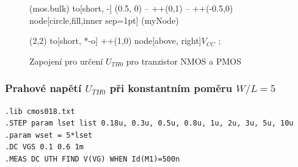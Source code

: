 \begin{figure}[H]
\begin{minipage}{0.5\textwidth}
\begin{circuitikz}[scale=1, transform shape]
              
              (mos.bulk) to[short, -] (0.5, 0) -- ++(0,1) -- ++(-0.5,0)  node[circle,fill,inner sep=1pt] (myNode) {}

              (2,2)  to[short, *-o] ++(1,0) node[above, right]{$V_{CC}$}
            ;
        \end{circuitikz}

        \vspace{5mm} 
    \end{minipage}
    \caption{\label{cod:cod_NP_WL_const} Zapojení pro určení \(U_{TH0}\) pro tranzistor NMOS a PMOS}
\end{figure}

\newpage
\subsubsection{Prahové napětí \(U_{TH0}\) při konstantním poměru \(W/L = 5\)}
\begin{lstlisting}[language=Spice, caption={Použitý kod simulace při konstantním poměru \(W/L = 5\)}]
.lib cmos018.txt
.STEP param lset list 0.18u, 0.3u, 0.5u, 0.8u, 1u, 2u, 3u, 5u, 10u
.param wset = 5*lset
.DC VGS 0.1 0.6 1m
.MEAS DC UTH FIND V(VG) WHEN Id(M1)=500n
\end{lstlisting}

